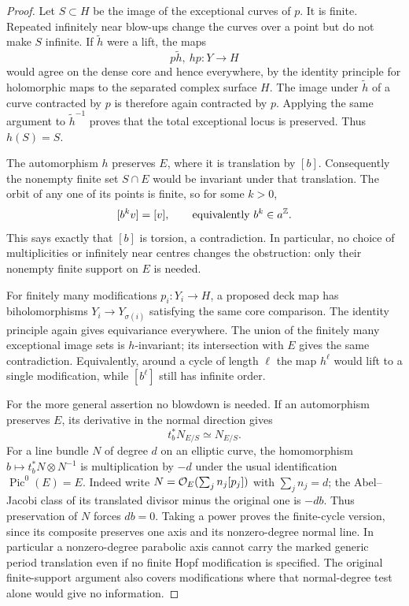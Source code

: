 \begin{proof}
Let $S\subset H$ be the image of the exceptional curves of $p$.
It is finite. Repeated infinitely near blow-ups change the curves
over a point but do not make $S$ infinite.
If $\widetilde h$ were a lift, the maps
\[
 p\widetilde h,\ hp:Y\longrightarrow H
\]
would agree on the dense core and hence everywhere, by the identity
principle for holomorphic maps to the separated complex surface $H$.
The image under $\widetilde h$ of a curve contracted by $p$ is
therefore again contracted by $p$. Applying the same argument to
$\widetilde h^{-1}$ proves that the total exceptional locus is
preserved. Thus $h(S)=S$.

The automorphism $h$ preserves $E$, where it is translation by
$[b]$. Consequently the nonempty finite set $S\cap E$ would be
invariant under that translation. The orbit of any one of its
points is finite, so for some $k>0$,
\[
 [b^k v]=[v],\qquad\text{equivalently } b^k\in a^\mathbb Z.
\]
This says exactly that $[b]$ is torsion, a contradiction.
In particular, no choice of multiplicities or infinitely near
centres changes the obstruction: only their nonempty finite
support on $E$ is needed.

For finitely many modifications $p_i:Y_i\to H$, a proposed deck
map has biholomorphisms
$Y_i\to Y_{\sigma(i)}$ satisfying the same core comparison.
The identity principle again gives equivariance everywhere.
The union of the finitely many exceptional image sets is
$h$-invariant; its intersection with $E$ gives the same contradiction.
Equivalently, around a cycle of length $\ell$ the map $h^\ell$
would lift to a single modification, while $[b^\ell]$ still has
infinite order.

For the more general assertion no blowdown is needed.
If an automorphism preserves $E$, its derivative in the normal
direction gives
\[
 t_b^*N_{E/S}\simeq N_{E/S}.
\]
For a line bundle $N$ of degree $d$ on an elliptic curve, the
homomorphism $b\mapsto t_b^*N\otimes N^{-1}$ is multiplication
by $-d$ under the usual identification $\operatorname{Pic}^0(E)=E$.
Indeed write $N=\mathcal O_E(\sum_j n_j[p_j])$ with
$\sum_j n_j=d$; the Abel--Jacobi class of its translated divisor
minus the original one is $-d b$.
Thus preservation of $N$ forces $d b=0$.
Taking a power proves the finite-cycle version, since its composite
preserves one axis and its nonzero-degree normal line.
In particular a nonzero-degree parabolic axis cannot carry the
marked generic period translation even if no finite Hopf
modification is specified. The original finite-support argument
also covers modifications where that normal-degree test alone
would give no information.


\end{proof}
